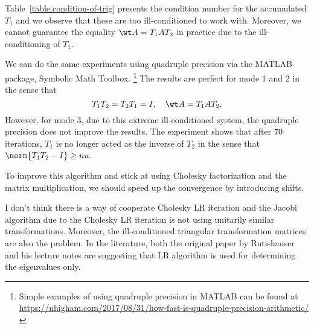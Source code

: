 Table~\ref{table.condition-of-trig} presents the condition number for the 
accumulated $T_{1}$ and we observe that these are too ill-conditioned to
work with. Moreover, we cannot guarantee the equality $\wt A = T_{1}AT_{2}$
in practice due to the ill-conditioning of $T_{1}$.

We can do the same experiments using quadruple precision via the MATLAB
package, Symbolic Math Toolbox.
\footnote{Simple examples of using quadruple precision in MATLAB can be
  found at
  \url{https://nhigham.com/2017/08/31/how-fast-is-quadruple-precision-arithmetic/}}  
The results are perfect for mode 1 and 2 in the sense that 
\begin{equation}\notag
  T_{1}T_{2} = T_{2}T_{1} = I, \quad \wt A = T_{1} A T_{2}.
\end{equation}
However, for mode 3, due to this extreme ill-conditioned system, the
quadruple precision does not improve the results.
The experiment shows that after 70 iterations,
$T_{1}$ is no longer acted as the inverse of $T_{2}$ in the sense that
$\norm{T_{1} T_{2} - I} \ge nu$.

To improve this algorithm and stick at using Cholesky factorization and the
matrix multiplication, we should speed up the convergence by introducing shifts.

\begin{mybox}
I don't think there is a way of cooperate Cholesky LR iteration and the
Jacobi algorithm due to the Cholesky LR iteration is not using unitarily
similar transformations. Moreover, the ill-conditioned triangular
transformation matrices are also the problem. In the literature, both the
original paper by Rutishauser~ and his lecture notes
 are suggesting that LR algorithm is used for 
determining the eigenvalues only.
\end{mybox}













